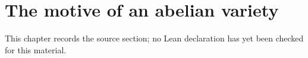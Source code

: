 \chapter{The motive of an abelian variety}
\label{standard-conjectures-abelian-fourfolds-chapter-04}

\begin{remark}
\label{standard-conjectures-abelian-fourfolds-chapter-04-source}
This chapter records the source section; no Lean declaration has yet been checked for this material.
\notready
\end{remark}

\label{reminder}





